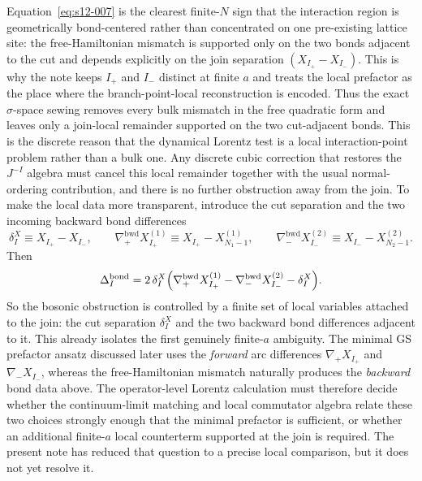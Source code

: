 \documentclass[11pt]{article}
\numberwithin{equation}{section}
\begin{document}
Equation~\eqref{eq:s12-007} is the clearest finite-$N$ sign that the interaction region is geometrically bond-centered rather than concentrated on one pre-existing lattice site: the free-Hamiltonian mismatch is supported only on the two bonds adjacent to the cut and depends explicitly on the join separation $(X_{I_+}-X_{I_-})$. This is why the note keeps $I_+$ and $I_-$ distinct at finite $a$ and treats the local prefactor as the place where the branch-point-local reconstruction is encoded.
Thus the exact $\sigma$-space sewing removes every bulk mismatch in the free quadratic form and leaves only a join-local remainder supported on the two cut-adjacent bonds. This is the discrete reason that the dynamical Lorentz test is a local interaction-point problem rather than a bulk one. Any discrete cubic correction that restores the $J^{-I}$ algebra must cancel this local remainder together with the usual normal-ordering contribution, and there is no further obstruction away from the join.
To make the local data more transparent, introduce the cut separation and the two incoming backward bond differences
\begin{equation}
\label{eq:s12-008}
\delta_I^X \equiv X_{I_+}-X_{I_-},
\qquad
\nabla_+^{\mathrm{bwd}}X_{I_+}^{(1)}\equiv X_{I_+}-X_{N_1-1}^{(1)},
\qquad
\nabla_-^{\mathrm{bwd}}X_{I_-}^{(2)}\equiv X_{I_-}-X_{N_2-1}^{(2)}.
\end{equation}
Then
\begin{equation}
\label{eq:s12-009}
\Delta_I^{\mathrm{bond}}
=
2\,\delta_I^X\Bigl(
\nabla_+^{\mathrm{bwd}}X_{I_+}^{(1)}
-\nabla_-^{\mathrm{bwd}}X_{I_-}^{(2)}
-\delta_I^X
\Bigr).
\end{equation}
So the bosonic obstruction is controlled by a finite set of local variables attached to the join: the cut separation $\delta_I^X$ and the two backward bond differences adjacent to it. This already isolates the first genuinely finite-$a$ ambiguity. The minimal GS prefactor ansatz discussed later uses the \emph{forward} arc differences $\nabla_+X_{I_+}$ and $\nabla_-X_{I_-}$, whereas the free-Hamiltonian mismatch naturally produces the \emph{backward} bond data above. The operator-level Lorentz calculation must therefore decide whether the continuum-limit matching and local commutator algebra relate these two choices strongly enough that the minimal prefactor is sufficient, or whether an additional finite-$a$ local counterterm supported at the join is required. The present note has reduced that question to a precise local comparison, but it does not yet resolve it.
\end{document}
